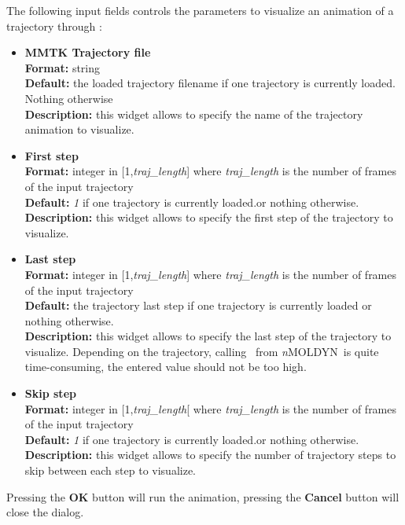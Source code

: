 \documentclass[a4paper,11pt]{report}
\newcommand{\NMOLDYN}{\textit{n}MOLDYN}
\begin{document}
The following input fields controls the parameters to visualize an animation of a trajectory through \VMD :

\hypertarget{animation_mmtk_trajectory_file}{}
\begin{itemize}
\item \textbf{MMTK Trajectory file}\\
\textbf{Format:} string\\
\textbf{Default:} the loaded trajectory filename if one trajectory is currently loaded. Nothing otherwise\\
\textbf{Description:} this widget allows to specify the name of the trajectory animation to visualize.

\hypertarget{animation_first_step}{}
\item \textbf{First step}\\
\textbf{Format:} integer in [1,\textit{traj\_length}] where \textit{traj\_length} is the number of frames of the input trajectory\\
\textbf{Default:} \textit{1} if one trajectory is currently loaded.or nothing otherwise.\\
\textbf{Description:} this widget allows to specify the first step of the trajectory to visualize.

\hypertarget{animation_last_step}{}
\item \textbf{Last step}\\
\textbf{Format:} integer in [1,\textit{traj\_length}] where \textit{traj\_length} is the number of frames of the input trajectory\\
\textbf{Default:} the trajectory last step if one trajectory is currently loaded or nothing otherwise.\\
\textbf{Description:} this widget allows to specify the last step of the trajectory to visualize. Depending on the 
trajectory, calling \VMD\ from \NMOLDYN\ is quite time-consuming, the entered value should not be too high.

\hypertarget{animation_skip_step}{}
\item \textbf{Skip step}\\
\textbf{Format:} integer in [1,\textit{traj\_length}[ where \textit{traj\_length} is the number of frames of the input trajectory\\
\textbf{Default:} \textit{1} if one trajectory is currently loaded.or nothing otherwise.\\
\textbf{Description:} this widget allows to specify the number of trajectory steps to skip between each step to visualize.
\end{itemize}
Pressing the \textbf{OK} button will run the animation, pressing the \textbf{Cancel} button will close the dialog.
\end{document}
